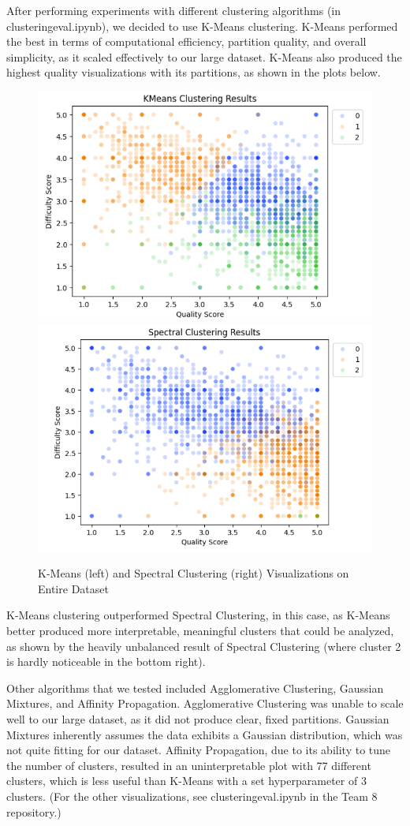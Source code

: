 \documentclass[sigconf,nonacm]{acmart}
\begin{document}
After performing experiments with different clustering algorithms (in clustering\textunderscore{}eval.ipynb), we decided to use K-Means clustering. K-Means performed the best in terms of computational efficiency, partition quality, and overall simplicity, as it scaled effectively to our large dataset. K-Means also produced the highest quality visualizations with its partitions, as shown in the plots below.


\begin{figure}[h]
    \centering
    \includegraphics[width=0.45\linewidth]{Screenshot 2024-11-19 175849.png}
    \includegraphics[width=0.45\linewidth]{spectral_clustering_results.png}
    \caption{K-Means (left) and Spectral Clustering (right) Visualizations on Entire Dataset}
    \label{fig:enter-label}
\end{figure}

K-Means clustering outperformed Spectral Clustering, in this case, as K-Means better produced more interpretable, meaningful clusters that could be analyzed, as shown by the heavily unbalanced result of Spectral Clustering (where cluster 2 is hardly noticeable in the bottom right). 

Other algorithms that we tested included Agglomerative Clustering, Gaussian Mixtures, and Affinity Propagation. Agglomerative Clustering was unable to scale well to our large dataset, as it did not produce clear, fixed partitions. Gaussian Mixtures inherently assumes the data exhibits a Gaussian distribution, which was not quite fitting for our dataset. Affinity Propagation, due to its ability to tune the number of clusters, resulted in an uninterpretable plot with 77 different clusters, which is less useful than K-Means with a set hyperparameter of 3 clusters. (For the other visualizations, see clustering\textunderscore{}eval.ipynb in the Team 8 repository.)
\end{document}
